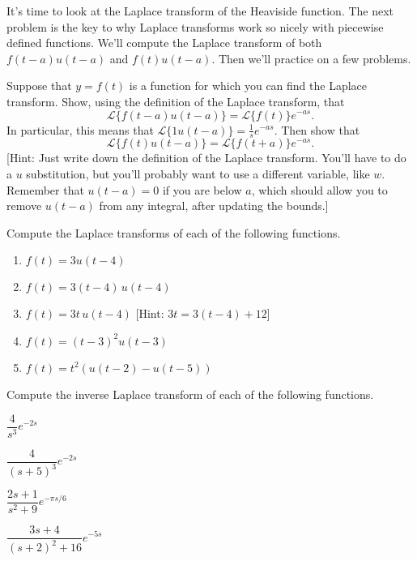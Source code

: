 It's time to look at the Laplace transform of the Heaviside function. The next problem is the key to why Laplace transforms work so nicely with piecewise defined functions.  We'll compute the Laplace transform of both $f(t-a)u(t-a)$ and $f(t)u(t-a)$.  Then we'll practice on a few problems.

\begin{problem}
 Suppose that $y=f(t)$ is a function for which you can find the Laplace transform.
 Show, using the definition of the Laplace transform, that 
$$\mathscr{L}\{f(t-a)u(t-a)\} = \mathscr{L}\{f(t)\}e^{-as}.$$
In particular, this means that $\mathscr{L}\{1u(t-a)\}=\frac{1}{s}e^{-as}$.  Then show that
$$\mathscr{L}\{f(t)u(t-a)\} = \mathscr{L}\{f(t+a)\}e^{-as}.$$
[Hint: Just write down the definition of the Laplace transform. You'll have to do a $u$ substitution, but you'll probably want to use a different variable, like $w$. Remember that $u(t-a)=0$ if you are below $a$, which should allow you to remove $u(t-a)$ from any integral, after updating the bounds.]
\end{problem}

\begin{problem}
 Compute the Laplace transforms of each of the following functions. 
 \begin{enumerate}
  \item $f(t) = 3u(t-4)$
  \item $f(t) = 3(t-4)\,u(t-4)$
  \item $f(t) = 3t\,u(t-4)$ [Hint: $3t=3(t-4)+12$]
  \item $f(t) = (t-3)^2u(t-3)$
  \item $f(t) = t^2(u(t-2)-u(t-5))$
 \end{enumerate}
\end{problem}

\begin{problem}
 Compute the inverse Laplace transform of each of the following functions.
 \begin{enumerate}
\begin{multicols}{4}  \item $\dfrac{4}{s^3}e^{-2s}$
  \item $\dfrac{4}{(s+5)^3}e^{-2s}$
  \item $\dfrac{2s+1}{s^2+9}e^{-\pi s/6}$
  \item $\dfrac{3s+4}{(s+2)^2+16}e^{-5s}$
 \end{multicols}
 \end{enumerate}
\end{problem}


